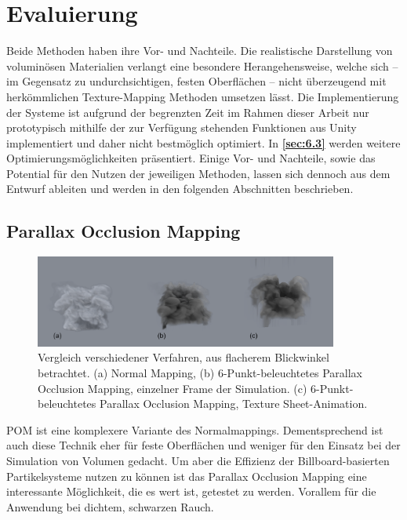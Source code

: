 \section{Evaluierung }
\label{sec:5}

Beide Methoden haben ihre Vor- und Nachteile. Die realistische Darstellung von voluminösen Materialien verlangt
eine besondere Herangehensweise, welche sich – im Gegensatz zu undurchsichtigen, festen Oberflächen –
nicht überzeugend mit herkömmlichen Texture-Mapping Methoden umsetzen lässt.
Die Implementierung der Systeme ist aufgrund der begrenzten Zeit im Rahmen dieser Arbeit nur prototypisch mithilfe der
zur Verfügung stehenden Funktionen aus Unity implementiert und daher nicht bestmöglich optimiert.
In \textbf{\autoref{sec:6.3}} werden weitere Optimierungsmöglichkeiten präsentiert.
Einige Vor- und Nachteile, sowie das Potential für den Nutzen der jeweiligen Methoden, lassen sich dennoch aus dem Entwurf
ableiten und werden in den folgenden Abschnitten beschrieben.


\subsection{Parallax Occlusion Mapping}
\label{sec:5.1}
\begin{figure}[h!]
	\centering
	\includegraphics[width=0.89\textwidth]{Grafiken/Implementation/pom_Vergleich.png}
	\begin{footnotesize}
		\caption{Vergleich verschiedener Verfahren, aus flacherem Blickwinkel betrachtet. 
		(a) Normal Mapping, (b) 6-Punkt-beleuchtetes Parallax Occlusion Mapping, einzelner Frame der Simulation. (c) 6-Punkt-beleuchtetes Parallax Occlusion Mapping, Texture Sheet-Animation. }
		\label{fig:pomVergleich}
	\end{footnotesize}
\end{figure}

POM ist eine komplexere Variante des Normalmappings. Dementsprechend ist auch diese Technik eher für feste Oberflächen und weniger
für den Einsatz bei der Simulation von Volumen gedacht. Um aber die Effizienz der Billboard-basierten Partikelsysteme
nutzen zu können ist das Parallax Occlusion Mapping eine interessante Möglichkeit, die es wert ist, getestet zu werden. Vorallem für die Anwendung bei dichtem, schwarzen Rauch.

